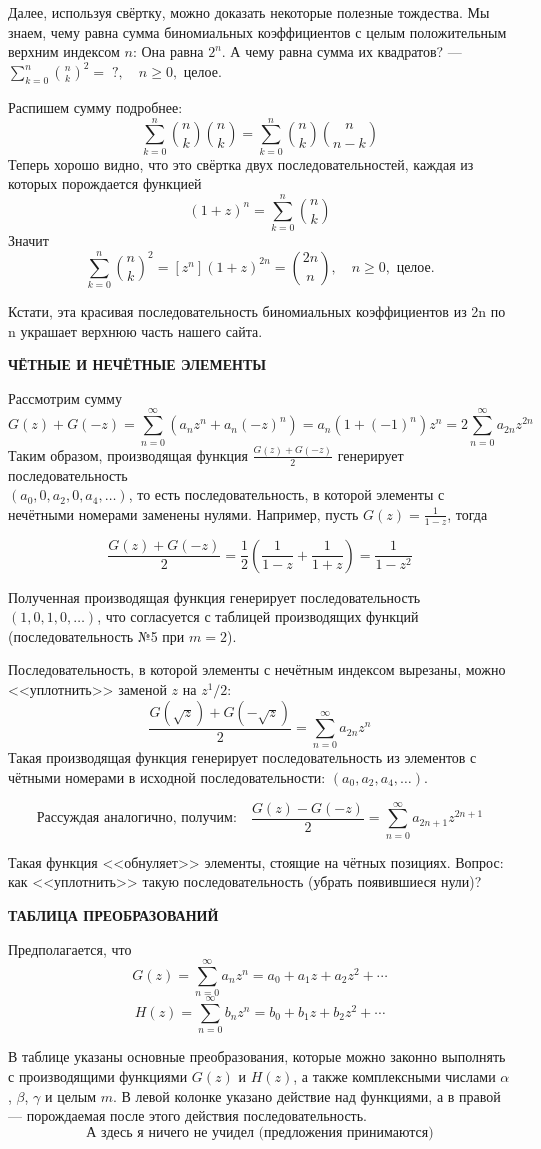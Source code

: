 \documentclass[12pt, letterpaper]{extarticle}
\begin{document}
Далее, используя свёртку, можно доказать некоторые полезные тождества. Мы знаем, чему равна сумма биномиальных коэффициентов с целым положительным верхним индексом $n$: Она равна $2^n$. А чему равна сумма их квадратов? — $\sum_{k=0}^{n} \binom{n}{k}^2 =\; \text{?}, \quad n\geq 0, \text{ целое}.$

Распишем сумму подробнее:
\[\sum_{k=0}^{n} \binom{n}{k}\binom{n}{k} = \sum_{k=0}^{n} \binom{n}{k}\binom{n}{n-k}\]
Теперь хорошо видно, что это свёртка двух последовательностей, каждая из которых порождается функцией
\[(1+z)^n = \sum_{k=0}^{n} \binom{n}{k}\]
Значит
\[\sum_{k=0}^{n} \binom{n}{k}^2 = [z^n](1+z)^{2n} = \binom{2n}{n}, \quad n\geq 0, \text { целое}.\]

Кстати, эта красивая последовательность биномиальных коэффициентов из 2n по n украшает верхнюю часть нашего сайта.
\begin{center}
  \textbf{ЧЁТНЫЕ И НЕЧЁТНЫЕ ЭЛЕМЕНТЫ}
\end{center}

Рассмотрим сумму
\[G(z) + G(-z) = \sum_{n=0}^{\infty} (a_nz^n+a_n(-z)^n) = a_n(1+(-1)^n)z^n=2\sum_{n=0}^{\infty} a_{2n}z^{2n}\]
Таким образом, производящая функция $\frac{G(z)+G(-z)}{2}$ генерирует последовательность \\$(a_0, 0, a_2, 0, a_4, \dotsc)$, то есть последовательность, в которой элементы с нечётными номерами заменены нулями. Например, пусть $G(z)=\frac{1}{1-z}$, тогда

\[\frac{G(z)+G(-z)}{2} = \frac12\left(\frac{1}{1-z}+\frac{1}{1+z}\right) = \frac{1}{1-z^2}\]

Полученная производящая функция генерирует последовательность $(1, 0, 1, 0,\dotsc)$, что согласуется с таблицей производящих функций (последовательность №5 при $m=2$).

Последовательность, в которой элементы с нечётным индексом вырезаны, можно <<уплотнить>> заменой $z$ на $z^1/2$:
\[\frac{G(\sqrt{z})+G(-\sqrt{z})}{2} = \sum_{n=0}^{\infty} a_{2n}z^n\]
Такая производящая функция генерирует последовательность из элементов с чётными номерами в исходной последовательности: $(a_0, a_2, a_4, \dotsc)$.

\[\text{Рассуждая аналогично, получим:}\quad\frac{G(z)-G(-z)}{2} = \sum_{n=0}^{\infty} a_{2n+1}z^{2n+1}\]

Такая функция <<обнуляет>> элементы, стоящие на чётных позициях. Вопрос: как <<уплотнить>> такую последовательность (убрать появившиеся нули)?
\begin{center}
  \textbf{ТАБЛИЦА ПРЕОБРАЗОВАНИЙ}
\end{center}

Предполагается, что
\[G(z) = \sum_{n=0}^{\infty}a_nz^n=a_0+a_1z+a_2z^2+\dotsb\]
\[H(z) = \sum_{n=0}^{\infty}b_nz^n=b_0+b_1z+b_2z^2+\dotsb\]

В таблице указаны основные преобразования, которые можно законно выполнять с производящими функциями $G(z)$ и $H(z)$, а также комплексными числами $\alpha$, $\beta$, $\gamma$ и целым $m$. В левой колонке указано действие над функциями, а в правой — порождаемая после этого действия последовательность.
\[\text{А здесь я ничего не учидел (предложения принимаются)}\]
\end{document}
